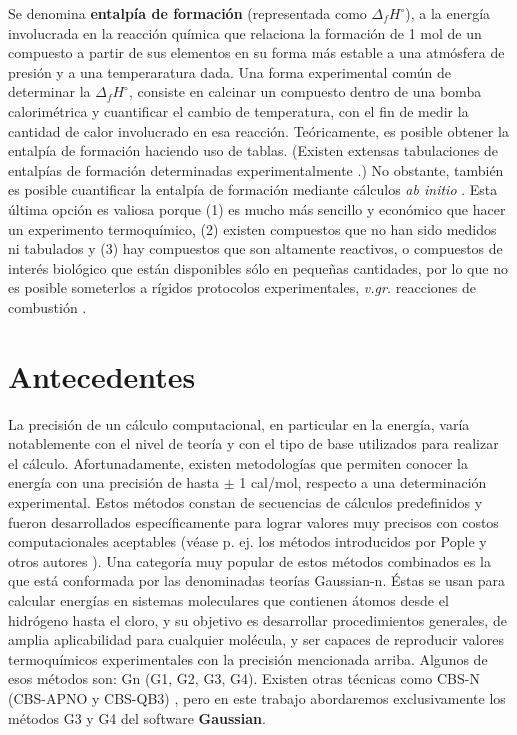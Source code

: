 \documentclass[12pt]{article}
\begin{document}
Se denomina \textbf{entalpía de formación} (representada como $\Delta_{f}H^{\circ}$), a la energía
involucrada en la reacción química que relaciona la formación de 1 mol de un compuesto a partir de sus elementos en su forma más estable a una atmósfera de presión y a una temperaratura dada.
Una forma experimental común de determinar la $\Delta_{f} H^{\circ}$, consiste en calcinar un compuesto dentro de una bomba calorimétrica y cuantificar el cambio de temperatura,
con el fin de medir la cantidad de calor involucrado en esa reacción. Teóricamente, es posible obtener la entalpía de formación haciendo uso de tablas. (Existen extensas tabulaciones de entalpías de formación determinadas experimentalmente  \cite{NIST1998, Tajti2004}.) No obstante, también es posible cuantificar la entalpía de formación mediante cálculos \textit{ab initio}  \cite{Lewars2016}.
Esta última opción es valiosa porque (1) es mucho más sencillo y económico que hacer un experimento termoquímico, (2) existen compuestos que no han sido medidos ni tabulados y (3) hay compuestos que son altamente reactivos, o compuestos de interés biológico que están disponibles sólo en pequeñas cantidades, por lo que no es posible someterlos a rígidos protocolos experimentales, \textit{v.gr.} reacciones de combustión  \cite{Lewars2016}.

\section*{Antecedentes}
La precisión de un cálculo computacional, en particular en la energía, varía notablemente con el nivel de teoría y con el tipo de base utilizados para realizar el cálculo.
Afortunadamente, existen metodologías que permiten conocer la energía con una precisión de
hasta $\pm$ 1 cal/mol, respecto a una determinación experimental. Estos métodos constan de secuencias
de cálculos predefinidos y fueron desarrollados específicamente para lograr valores muy precisos
con costos computacionales aceptables (véase p. ej. los métodos introducidos por Pople y otros
autores  \cite{Cuevas2003}). Una categoría muy popular de estos métodos combinados es la que está
conformada por las denominadas teorías Gaussian-n.
Éstas se usan para calcular energías en sistemas moleculares que contienen átomos desde
el hidrógeno hasta el cloro, y su objetivo es desarrollar procedimientos generales,
de amplia aplicabilidad para cualquier molécula, y ser capaces de reproducir valores
termoquímicos experimentales con la precisión mencionada arriba.
Algunos de esos métodos son: Gn (G1, G2, G3, G4).  Existen otras técnicas como CBS-N
(CBS-APNO y CBS-QB3)  \cite{Simmie2015}, pero en este trabajo abordaremos exclusivamente
los métodos G3 y G4 del software \textbf{Gaussian}.
\end{document}
